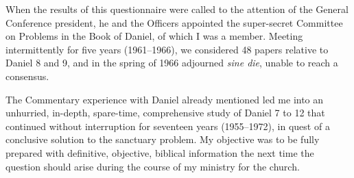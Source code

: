 When the results of this questionnaire were called to the attention of the
General Conference president, he and the Officers appointed the super-secret
Committee on Problems in the Book of Daniel, of which I was a member.
Meeting intermittently for five years (1961--1966), we considered 48 papers
relative to Daniel 8 and 9, and in the spring of 1966 adjourned \textit{sine die},
unable to reach a consensus.

The Commentary experience with Daniel already mentioned led me into an
unhurried, in-depth, spare-time, comprehensive study of Daniel 7 to 12
that continued without interruption for seventeen years (1955--1972), in
quest of a conclusive solution to the sanctuary problem. My objective was to
be fully prepared with definitive, objective, biblical information the next
time the question should arise during the course of my ministry for the
church.

